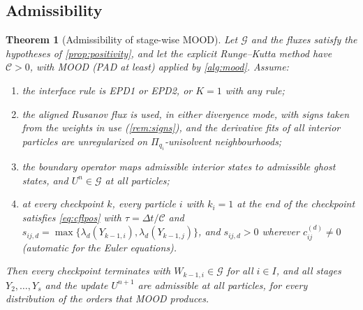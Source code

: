 \documentclass[11pt,a4paper]{article}
\theoremstyle{plain}
\newtheorem{theorem}{Theorem}[section]
\theoremstyle{definition}
\theoremstyle{remark}
\numberwithin{equation}{section}
\newcommand{\Ad}{\mathcal{G}}
\newcommand{\Csp}{\mathcal{C}}
\begin{document}
\subsection{Admissibility}

\begin{theorem}[Admissibility of stage-wise MOOD]\label{thm:mood}
Let $\Ad$ and the fluxes satisfy the hypotheses of \cref{prop:positivity}, and let the explicit Runge--Kutta method have $\Csp>0$, with MOOD (PAD at least) applied by \cref{alg:mood}. Assume:
\begin{enumerate}[label=(H\arabic*)]
\item the interface rule is EPD1 or EPD2, or $K=1$ with any rule;
\item the aligned Rusanov flux is used, in either divergence mode, with signs taken from the weights in use (\cref{rem:signs}), and the derivative fits of all interior particles are unregularized on $\Pi_{q_i}$-unisolvent neighbourhoods;
\item the boundary operator maps admissible interior states to admissible ghost states, and $U^n\in\Ad$ at all particles;
\item at every checkpoint $k$, every particle $i$ with $k_i=1$ at the end of the checkpoint satisfies \eqref{eq:cflpos} with $\tau=\Delta t/\Csp$ and $s_{ij,d}=\max\{\lambda_d(Y_{k-1,i}),\lambda_d(Y_{k-1,j})\}$, and $s_{ij,d}>0$ wherever $c^{(d)}_{ij}\ne0$ (automatic for the Euler equations).
\end{enumerate}
Then every checkpoint terminates with $W_{k-1,i}\in\Ad$ for all $i\in I$, and all stages $Y_2,\dots,Y_s$ and the update $U^{n+1}$ are admissible at all particles, for every distribution of the orders that MOOD produces.
\end{theorem}
\end{document}
